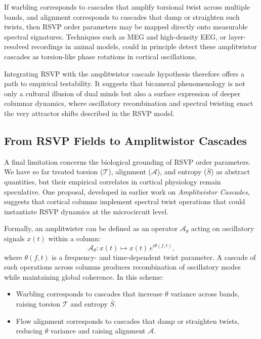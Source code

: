 \documentclass[a4paper,11pt]{article}
\begin{document}
If warbling corresponds to cascades that amplify torsional twist across
multiple bands, and alignment corresponds to cascades that damp or straighten
such twists, then RSVP order parameters may be mapped directly onto measurable
spectral signatures. Techniques such as MEG and high-density EEG, or
layer-resolved recordings in animal models, could in principle detect these
amplitwistor cascades as torsion-like phase rotations in cortical oscillations.

Integrating RSVP with the amplitwistor cascade hypothesis therefore offers a
path to empirical testability. It suggests that bicameral phenomenology is not
only a cultural illusion of dual minds but also a surface expression of deeper
columnar dynamics, where oscillatory recombination and spectral twisting enact
the very attractor shifts described in the RSVP model.

\subsection{From RSVP Fields to Amplitwistor Cascades}

A final limitation concerns the biological grounding of RSVP order parameters.
We have so far treated torsion ($\mathcal{T}$), alignment ($\mathcal{A}$), and
entropy ($\bar{S}$) as abstract quantities, but their empirical correlates in
cortical physiology remain speculative. One proposal, developed in earlier work
on \emph{Amplitwistor Cascades}, suggests that cortical columns implement
spectral twist operations that could instantiate RSVP dynamics at the
microcircuit level.

Formally, an amplitwister can be defined as an operator $\mathcal{A}_\theta$
acting on oscillatory signals $x(t)$ within a column:
\[
\mathcal{A}_\theta : x(t) \mapsto x(t)\,e^{i\theta(f,t)} ,
\]
where $\theta(f,t)$ is a frequency- and time-dependent twist parameter. A
cascade of such operations across columns produces recombination of oscillatory
modes while maintaining global coherence. In this scheme:
\begin{itemize}
    \item Warbling corresponds to cascades that increase $\theta$ variance
    across bands, raising torsion $\mathcal{T}$ and entropy $\bar{S}$.
    \item Flow alignment corresponds to cascades that damp or straighten twists,
    reducing $\theta$ variance and raising alignment $\mathcal{A}$.
\end{itemize}
\end{document}
